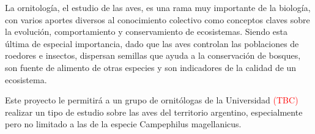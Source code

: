 La ornitología, el estudio de las aves, es una rama muy importante de la biología, con varios aportes diversos al conocimiento colectivo como conceptos claves sobre la evolución, comportamiento y conservamiento de ecosistemas. Siendo esta última de especial importancia, dado que las aves controlan las poblaciones de roedores e insectos, dispersan semillas que ayuda a la conservación de bosques, son fuente de alimento de otras especies y son indicadores de la calidad de un ecosistema.

Este proyecto le permitirá a un grupo de ornitólogas de la Universidad \textcolor{red}{(TBC)} realizar un tipo de estudio \TBC sobre las aves del territorio argentino, especialmente pero no limitado a las de la especie Campephilus magellanicus.
